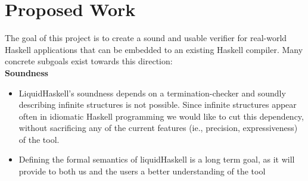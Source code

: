 \section*{Proposed Work}

The goal of this project is to create a sound and usable verifier
for real-world Haskell applications that can be embedded to an
existing Haskell compiler.
%
Many concrete subgoals exist towards this direction: \\

\textbf{Soundness}
\begin{itemize}
\item
LiquidHaskell's soundness
depends on a termination-checker and
soundly describing infinite structures is not possible.
%
Since infinite structures appear often in 
idiomatic Haskell programming
we would like to cut this dependency, 
without sacrificing any of the current 
features (ie., precision, expressiveness) of the tool.



\item 
Defining the formal semantics of liquidHaskell
is a long term goal, 
as it will provide to both us and the users 
a better understanding of the tool
\end{itemize}



